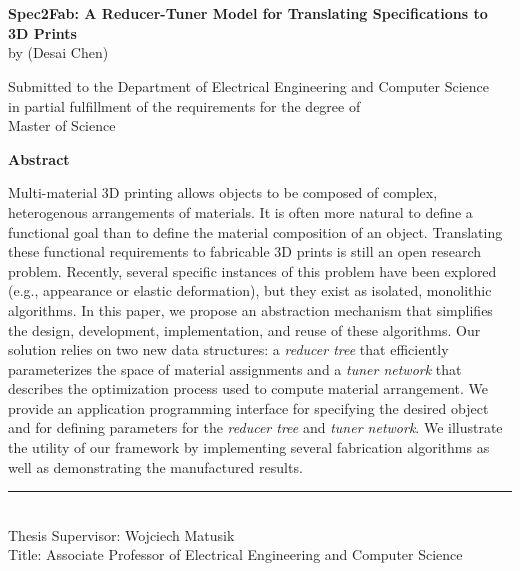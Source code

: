 \chapter*{}
\label{chap:abstract}
\begin{center}
\vspace{-8em}
{\large \textsf{\textbf{Spec2Fab: A Reducer-Tuner Model for Translating Specifications to 3D Prints}}} \\
by (Desai Chen)

\vspace{.2in}

Submitted to the Department of Electrical Engineering and Computer Science \\
in partial fulfillment of the requirements for the degree of \\
Master of Science \\ %
\end{center}

\noindent\textsf{\textbf{Abstract}}

\noindent Multi-material 3D printing allows objects to be composed of complex, heterogenous arrangements of materials. It is often more natural to define a functional goal than to define the material composition of an object. Translating these functional requirements to fabricable 3D prints is still an open research problem. Recently, several specific instances of this problem have been explored (e.g.,  appearance or elastic deformation), but they exist as isolated, monolithic algorithms. In this paper, we propose an abstraction mechanism that simplifies the design, development, implementation, and reuse of these algorithms. Our solution relies on two new data structures: a \emph{reducer tree} that efficiently parameterizes the space of material assignments and a \emph{tuner network} that describes the optimization process used to compute material arrangement. We provide an application programming interface for specifying the desired object and for defining parameters for the \emph{reducer tree} and \emph{tuner network}. We illustrate the utility of our framework by implementing several fabrication algorithms as well as demonstrating the manufactured results.

\noindent\rule[0.5ex]{2in}{1pt} \\
Thesis Supervisor: Wojciech Matusik\\
Title:  Associate Professor of Electrical Engineering and Computer Science



